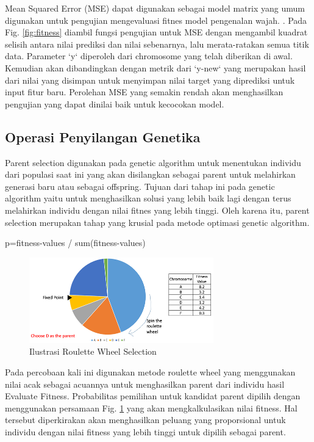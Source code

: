 \documentclass[conference]{IEEEtran}
\begin{document}
Mean Squared Error (MSE) dapat digunakan sebagai model matrix yang umum digunakan untuk pengujian mengevaluasi fitnes model pengenalan wajah. \cite{Hussein2020}. Pada Fig. \ref{fig:fitness} diambil fungsi pengujian untuk MSE dengan mengambil kuadrat selisih antara nilai prediksi dan nilai sebenarnya, lalu merata-ratakan semua titik data. Parameter `y` diperoleh dari chromosome yang telah diberikan di awal. Kemudian akan dibandingkan dengan metrik dari `y-new` yang merupakan hasil dari nilai yang disimpan untuk menyimpan nilai target yang diprediksi untuk input fitur baru. Perolehan MSE yang semakin rendah akan menghasilkan pengujian yang dapat dinilai baik untuk kecocokan model.

\subsection{Operasi Penyilangan Genetika}

Parent selection digunakan pada genetic algorithm untuk menentukan individu dari populasi saat ini yang akan disilangkan sebagai parent untuk melahirkan generasi baru atau sebagai offspring. Tujuan dari tahap ini pada genetic algorithm yaitu untuk menghasilkan solusi yang lebih baik lagi dengan terus melahirkan individu dengan nilai fitnes yang lebih tinggi. Oleh karena itu, parent selection merupakan tahap yang krusial pada metode optimasi genetic algorithm.

\begin{center} p=fitness-values / sum(fitness-values) \end{center}

\begin{figure}[htp]
    \centering
    \includegraphics[width=8cm]{images/roulette_wheel_selection.jpg}
    \caption{Ilustrasi Roulette Wheel Selection}
    \label{fig:parent}
\end{figure}

Pada percobaan kali ini digunakan metode roulette wheel yang menggunakan nilai acak sebagai acuannya untuk menghasilkan parent dari individu hasil Evaluate Fitness. Probabilitas pemilihan untuk kandidat parent dipilih dengan menggunakan persamaan Fig. \ref{fig:parent} yang akan mengkalkulasikan nilai fitness. Hal tersebut diperkirakan akan menghasilkan peluang yang proporsional untuk individu dengan nilai fitness yang lebih tinggi untuk dipilih sebagai parent.
\end{document}
